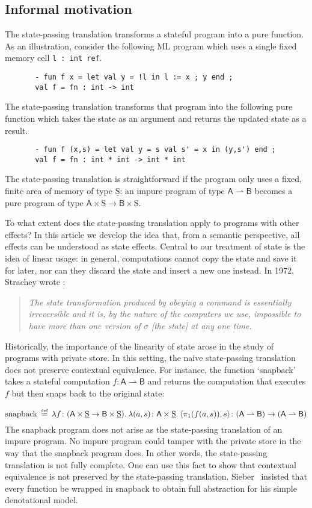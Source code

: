 \documentclass{LMCS}
\newcommand{\hide}[1]{}
\newcommand{\pto}{\rightharpoonup}
\newcommand{\co}{\colon}
\newcommand{\VA}{\mathsf{A}}
\newcommand{\VB}{\mathsf{B}}
\newcommand{\lam}[3]{\lambda #1.\: #3}
\newcommand{\pair}[2]{\langle #1 , #2 \rangle}
\newcommand{\states}{{\underline{\mathrm{S}}}}
\newcommand{\defeq}{\mathrel{\,\stackrel{\mbox{\tiny{$\mathrm{def}$}}}=\,}}
\begin{document}
\subsection{Informal motivation}
The state-passing translation 
transforms a stateful program into a pure function. 
As an illustration, consider the following ML program
which uses a single fixed memory cell \verb|l : int ref|.
\begin{verbatim}
       - fun f x = let val y = !l in l := x ; y end ;
       val f = fn : int -> int
\end{verbatim}
The state-passing translation transforms that program into 
the following pure function which takes the state as an argument
and returns the updated state as a result.
\begin{verbatim}
       - fun f (x,s) = let val y = s val s' = x in (y,s') end ;      
       val f = fn : int * int -> int * int
\end{verbatim}
The state-passing translation is straightforward
if the program only uses a fixed, finite area of memory of type $\states$:
an impure program of type $\VA\pto\VB$ becomes a pure program
of type $\VA\times \states\to \VB\times \states$.


To what extent does the state-passing translation apply to programs with
other effects?
In this article we develop the idea
that, from a semantic perspective, 
all effects can be understood as state effects.
Central to our treatment of state is the idea of 
linear usage: in general, computations cannot copy the state and 
save it for later, nor
can they discard the state and insert a new one instead.
In 1972, Strachey wrote \cite{Strachey72}:
\begin{quote}
\emph{The state transformation produced by obeying a command is essentially irreversible and it is, by the nature of the computers we use, impossible to have
more than one version of $\sigma$ \emph{[the state]} at any one time.}
\end{quote}
Historically, the importance of the linearity of state
arose in the study of 
programs with private store. 
In this setting, the naive state-passing translation does not preserve 
contextual equivalence. 
For instance, the function `snapback' takes a
stateful computation $f \co \VA \pto \VB$ and returns the computation that
executes $f$ but then snaps back to the original state:
\hide{\[ 
\textrm{snapback}\defeq
\lam{f \co (\VA\times \states \to \VB\times \states)}{(\VA\pto \VB)}{\lam{x \co \VA \times \states}{}{\pair{\pi_1(f(x))}{\pi_2(x)}}} \co (\VA\pto \VB) \to (\VA\pto \VB)\]}
\[ 
\textrm{snapback}\defeq
\lam{f \co (\VA\times \states \to \VB\times \states)}{(\VA\pto \VB)}{\lam{(a,s)\co \VA \times \states}{}{\pair{\pi_1(f(a,s))}{s}}} \co (\VA\pto \VB) \to (\VA\pto \VB)\]
The snapback program does not arise as the state-passing translation
of an impure program. 
No impure program could tamper with the private store in the way 
that the snapback program does.
In other words, the state-passing translation
is not fully complete.
One can use this fact to show that 
contextual equivalence is not preserved by the 
state-passing translation. 
Sieber~\cite{DBLP:conf/mfcs/Sieber94} 
insisted that every function be wrapped in snapback to obtain 
full abstraction for his simple denotational model.
\end{document}
